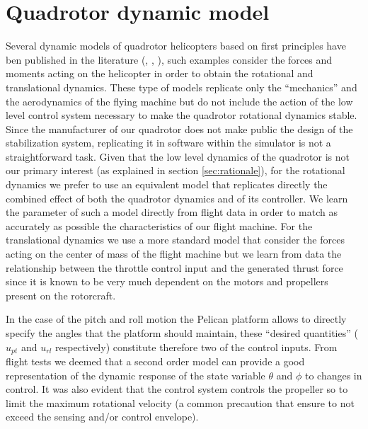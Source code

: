 \documentclass[a4paper,11pt]{report}
\begin{document}
\section{Quadrotor dynamic model}

Several dynamic models of quadrotor helicopters based on first principles have ben published in the literature (\cite{bouabdallah07phd}, \cite{balas07modelling}, \cite{hoffmann07quadrotor}), such examples consider the forces and moments acting on the helicopter in order to obtain the rotational and translational dynamics.
These type of models replicate only the ``mechanics'' and the aerodynamics of the flying machine but do not include the action of the low level control system necessary to make the quadrotor rotational dynamics stable. Since the manufacturer of our quadrotor does not make public the design of the stabilization system, replicating it in software within the simulator is not a straightforward task. Given that the low level dynamics of the quadrotor is not our primary interest (as explained in section \ref{sec:rationale}), for the rotational dynamics we prefer to use an equivalent  model that replicates directly the combined effect of both the quadrotor dynamics and of its controller.
We learn the parameter of such a model directly from flight data in order to match as accurately as possible the characteristics of our flight machine.
For the translational dynamics we use a more standard model that consider the forces acting on the center of mass of the flight machine but we learn from data the relationship between the throttle control input and the generated thrust force since it is known to be very much dependent on the motors and propellers present on the rotorcraft.

In the case of the pitch and roll motion the Pelican platform allows to directly specify the angles that the platform should maintain, these ``desired quantities'' ($u_{pt}$ and $u_{rl}$ respectively) constitute therefore two of the control inputs. 
From flight tests we deemed that a second order model can provide a good representation of the dynamic response of the state variable $\theta$ and $\phi$ to changes in control. It was also evident that the control system controls the propeller so to limit the maximum rotational velocity (a common precaution that ensure to not exceed the sensing and/or control envelope). 
\end{document}
